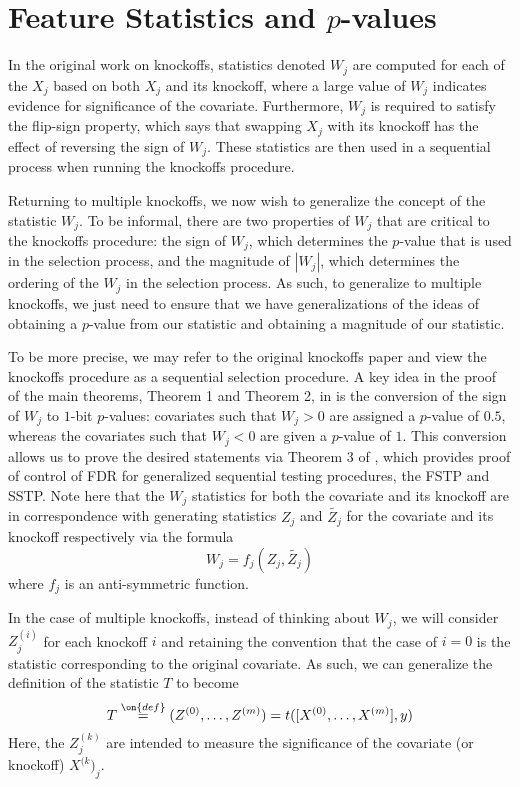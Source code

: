 \documentclass[11pt,reqno]{report}
\theoremstyle{definition}
\numberwithin{equation}{section}
\begin{document}
\section{Feature Statistics and \texorpdfstring{$p$}{p}-values}
In the original work on knockoffs, statistics denoted $W_j$ are computed for each of the $X_j$ based on both $X_j$ and its knockoff, where a large value of $W_j$ indicates evidence for significance of the covariate. Furthermore, $W_j$ is required to satisfy the flip-sign property, which says that swapping $X_j$ with its knockoff has the effect of reversing the sign of $W_j$. These statistics are then used in a sequential process when running the knockoffs procedure.

Returning to multiple knockoffs, we now wish to generalize the concept of the statistic $W_j$. To be informal, there are two properties of $W_j$ that are critical to the knockoffs procedure: the sign of $W_j$, which determines the $p$-value that is used in the selection process, and the magnitude of $|W_j|$, which determines the ordering of the $W_j$ in the selection process. As such, to generalize to multiple knockoffs, we just need to ensure that we have generalizations of the ideas of obtaining a $p$-value from our statistic and obtaining a magnitude of our statistic. 

To be more precise, we may refer to the original knockoffs paper \cite{knockoffs} and view the knockoffs procedure as a sequential selection procedure. A key idea in the proof of the main theorems, Theorem 1 and Theorem 2, in \cite{knockoffs} is the conversion of the sign of $W_j$ to $1$-bit $p$-values: covariates such that $W_j > 0$ are assigned a $p$-value of $0.5$, whereas the covariates such that $W_j < 0$ are given a $p$-value of $1$. This conversion allows us to prove the desired statements via Theorem 3 of \cite{knockoffs}, which provides proof of control of FDR for generalized sequential testing procedures, the FSTP and SSTP. Note here that the $W_j$ statistics for both the covariate and its knockoff are in correspondence with generating statistics $Z_j$ and $\tilde{Z_j}$ for the covariate and its knockoff respectively via the formula
\begin{equation}
W_j = f_j(Z_j, \tilde{Z_j})
\end{equation}
where $f_j$ is an anti-symmetric function. 

In the case of multiple knockoffs, instead of thinking about $W_j$, we will consider $Z_j^{(i)}$ for each knockoff $i$ and retaining the convention that the case of $i = 0$ is the statistic corresponding to the original covariate. As such, we can generalize the definition of the statistic $T$ to become
\begin{equation}
T \overset{\on{def}}{=} (Z^{(0)},\ldots, Z^{(m)}) = t([X^{(0)}, \ldots, X^{(m)}], y)
\end{equation}
Here, the $Z^{(k)}_j$ are intended to measure the significance of the covariate (or knockoff) $X^{(k})_j$. 
\end{document}
